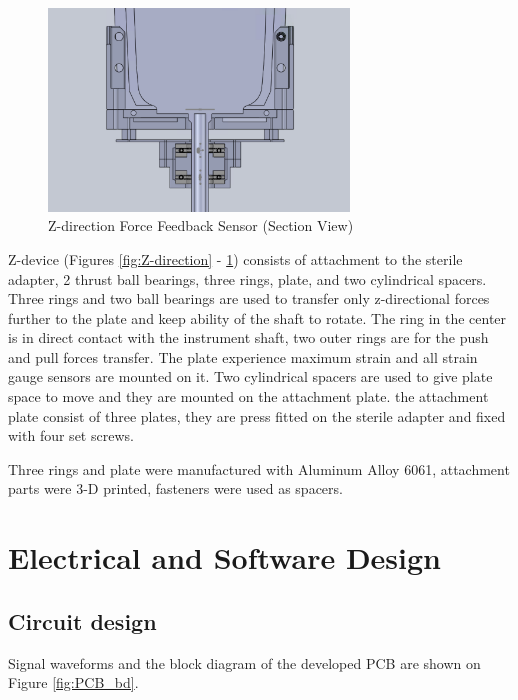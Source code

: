 \begin{figure}[h]
	\begin{center}
		\includegraphics[width=80mm]{fig/methods/z_dir_sec.png}
	\end{center}
	\vspace{-4mm}
	\caption[Z-direction Force Feedback Sensor (Section View)]
	{Z-direction Force Feedback Sensor (Section View)}
	\label{fig:Z-direction_sec}
	\vspace{-2mm}
\end{figure}


Z-device (Figures \ref{fig:Z-direction} - \ref{fig:Z-direction_sec}) consists of attachment to the sterile adapter, 2 thrust ball bearings, three rings, plate, and two cylindrical spacers. Three rings and two ball bearings are used to transfer only z-directional forces further to the plate and keep ability of the shaft to rotate. The ring in the center is in direct contact with the instrument shaft, two outer rings are for the push and pull forces transfer. The plate experience maximum strain and all strain gauge sensors are mounted on it.  Two cylindrical spacers are used to give plate space to move and they are mounted on the attachment plate. the attachment plate consist of three plates, they are press fitted on the sterile adapter and fixed with four set screws.

Three rings and plate were manufactured with Aluminum Alloy 6061, attachment parts were 3-D printed, fasteners were used as spacers.


\section{Electrical and Software Design}
\label{sec:elecDes}

	\subsection{Circuit design}
	\label{sec:cirDes}
	Signal waveforms and the block diagram of the developed PCB are shown on Figure \ref{fig:PCB_bd}.

